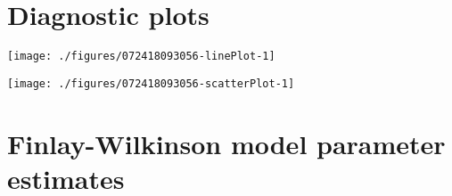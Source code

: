 \documentclass[a4paper,11pt]{article}\usepackage[]{graphicx}\usepackage[]{color}
\newenvironment{knitrout}{}{} %
\begin{document}
\clearpage
\section{Diagnostic plots}
\begin{knitrout}
\color{fgcolor}

\texttt{[image: ./figures/072418093056-linePlot-1]} \hfill{}



\end{knitrout}
\clearpage
\begin{knitrout}
\color{fgcolor}
\texttt{[image: ./figures/072418093056-scatterPlot-1]} 

\end{knitrout}
\clearpage

\section{Finlay-Wilkinson model parameter estimates}
\end{document}
